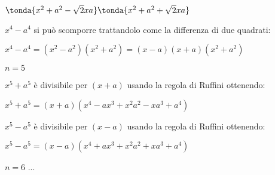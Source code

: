 \begin{itemize*}
\begin{itemize*}
   \(\tonda{x^2+a^2-\sqrt{2}xa}\tonda{x^2+a^2+\sqrt{2}xa}\)
   
  \item \(x^4-a^4\) si può scomporre trattandolo come la differenza di due 
   quadrati:
   
   \(x^4-a^4 = (x^2-a^2)(x^2+a^2) = (x-a)(x+a)(x^2+a^2) \)
 \end{itemize*}

 \item \(n=5\)
 \begin{itemize*}
  \item \(x^5+a^5\) è divisibile per \((x+a)\) usando la regola di Ruffini
   ottenendo: 
   
   \(x^5+a^5=(x+a)(x^4-ax^3+x^2a^2-xa^3+a^4)\)
   
  \item \(x^5-a^5\) è divisibile per \((x-a)\) usando la regola di Ruffini
   ottenendo: 
   
   \(x^5-a^5=(x-a)(x^4+ax^3+x^2a^2+xa^3+a^4)\)
   
 \end{itemize*}

 \item \(n=6\) ...
 
\end{itemize*}

%  
% 
% 
% 
%  
% 
% 
% 
% 
% 


